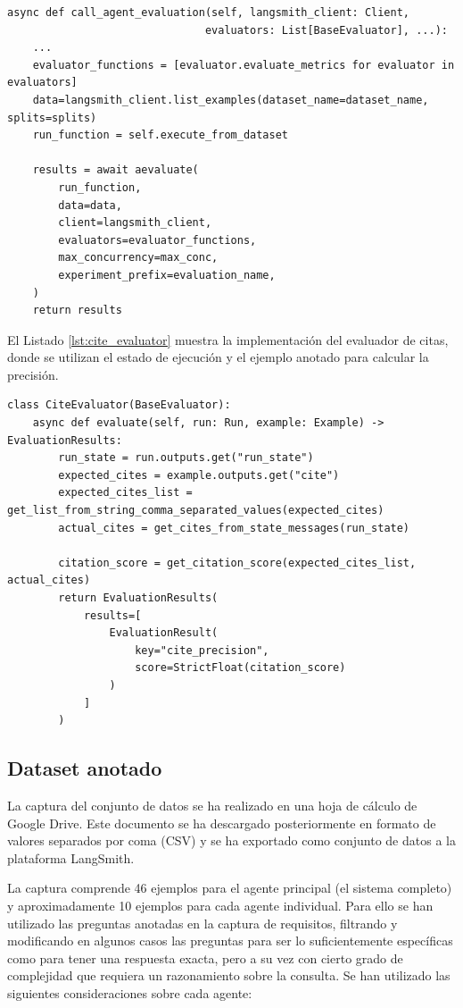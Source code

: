 \begin{lstlisting}[caption={Llamada a evaluación de agentes},label={lst:call_evaluation}]
async def call_agent_evaluation(self, langsmith_client: Client, 
                               evaluators: List[BaseEvaluator], ...):
    ...
    evaluator_functions = [evaluator.evaluate_metrics for evaluator in evaluators]
    data=langsmith_client.list_examples(dataset_name=dataset_name, splits=splits)
    run_function = self.execute_from_dataset

    results = await aevaluate(
        run_function,
        data=data,
        client=langsmith_client,
        evaluators=evaluator_functions,
        max_concurrency=max_conc,
        experiment_prefix=evaluation_name,
    )
    return results
\end{lstlisting}

El Listado \ref{lst:cite_evaluator} muestra la implementación del evaluador de citas, donde se utilizan el estado de ejecución y el ejemplo anotado para calcular la precisión.

\begin{lstlisting}[caption={Evaluador de citas},label={lst:cite_evaluator}]
class CiteEvaluator(BaseEvaluator):
    async def evaluate(self, run: Run, example: Example) -> EvaluationResults:
        run_state = run.outputs.get("run_state")
        expected_cites = example.outputs.get("cite")
        expected_cites_list = get_list_from_string_comma_separated_values(expected_cites)
        actual_cites = get_cites_from_state_messages(run_state)

        citation_score = get_citation_score(expected_cites_list, actual_cites)
        return EvaluationResults(
            results=[
                EvaluationResult(
                    key="cite_precision",
                    score=StrictFloat(citation_score)
                )
            ]
        )
\end{lstlisting}


\subsection{Dataset anotado}
\label{sec:dataset}
La captura del conjunto de datos se ha realizado en una hoja de cálculo de Google Drive. Este documento se ha descargado posteriormente en formato de valores separados por coma (CSV) y se ha exportado como conjunto de datos a la plataforma LangSmith.

La captura comprende 46 ejemplos para el agente principal (el sistema completo) y aproximadamente 10 ejemplos para cada agente individual. Para ello se han utilizado las preguntas anotadas en la captura de requisitos, filtrando y modificando en algunos casos las preguntas para ser lo suficientemente específicas como para tener una respuesta exacta, pero a su vez con cierto grado de complejidad que requiera un razonamiento sobre la consulta. Se han utilizado las siguientes consideraciones sobre cada agente:

